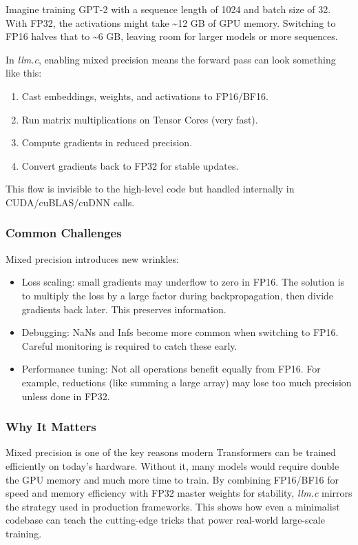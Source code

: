 \documentclass[
  letterpaper,
  DIV=11,
  numbers=noendperiod]{scrreprt}
\providecommand{\tightlist}{%
  \setlength{\itemsep}{0pt}\setlength{\parskip}{0pt}}
\begin{document}
Imagine training GPT-2 with a sequence length of 1024 and batch size of
32. With FP32, the activations might take \textasciitilde12 GB of GPU
memory. Switching to FP16 halves that to \textasciitilde6 GB, leaving
room for larger models or more sequences.

In \emph{llm.c}, enabling mixed precision means the forward pass can
look something like this:

\begin{enumerate}
\def\labelenumi{\arabic{enumi}.}
\tightlist
\item
  Cast embeddings, weights, and activations to FP16/BF16.
\item
  Run matrix multiplications on Tensor Cores (very fast).
\item
  Compute gradients in reduced precision.
\item
  Convert gradients back to FP32 for stable updates.
\end{enumerate}

This flow is invisible to the high-level code but handled internally in
CUDA/cuBLAS/cuDNN calls.

\subsubsection{Common Challenges}\label{common-challenges}

Mixed precision introduces new wrinkles:

\begin{itemize}
\tightlist
\item
  Loss scaling: small gradients may underflow to zero in FP16. The
  solution is to multiply the loss by a large factor during
  backpropagation, then divide gradients back later. This preserves
  information.
\item
  Debugging: NaNs and Infs become more common when switching to FP16.
  Careful monitoring is required to catch these early.
\item
  Performance tuning: Not all operations benefit equally from FP16. For
  example, reductions (like summing a large array) may lose too much
  precision unless done in FP32.
\end{itemize}

\subsubsection{Why It Matters}\label{why-it-matters-40}

Mixed precision is one of the key reasons modern Transformers can be
trained efficiently on today's hardware. Without it, many models would
require double the GPU memory and much more time to train. By combining
FP16/BF16 for speed and memory efficiency with FP32 master weights for
stability, \emph{llm.c} mirrors the strategy used in production
frameworks. This shows how even a minimalist codebase can teach the
cutting-edge tricks that power real-world large-scale training.
\end{document}
